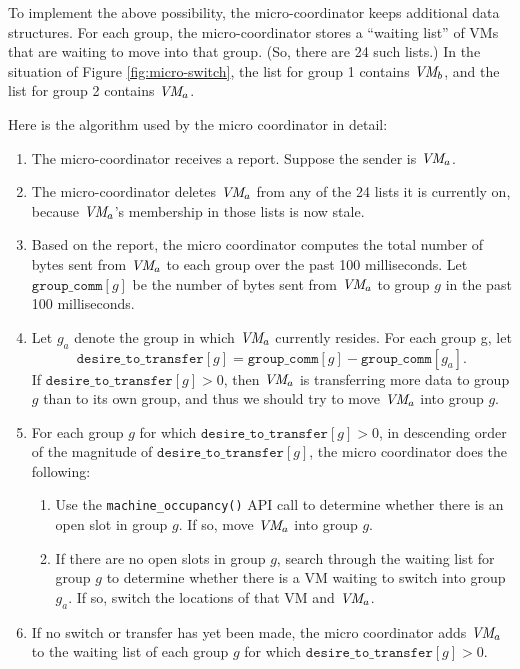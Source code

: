 \documentclass[11pt]{article}
\begin{document}
To implement the above possibility, the micro-coordinator keeps additional data structures.  For each group, the micro-coordinator stores a ``waiting list'' of VMs that are waiting to move into that group.  (So, there are 24 such lists.)  In the situation of Figure \ref{fig:micro-switch}, the list for group 1 contains $\textit{VM}_b$, and the list for group 2 contains $\textit{VM}_a$.

Here is the algorithm used by the micro coordinator in detail:
\begin{enumerate}
  \item The micro-coordinator receives a report.  Suppose the sender is $\textit{VM}_a$.
  \item The micro-coordinator deletes $\textit{VM}_a$ from any of the 24 lists it is currently on, because $\textit{VM}_a$'s membership in those lists is now stale.
  \item Based on the report, the micro coordinator computes the total number of bytes sent from $\textit{VM}_a$ to each group over the past 100 milliseconds.  Let $\texttt{group\_comm}[g]$ be the number of bytes sent from $\textit{VM}_a$ to group $g$ in the past 100 milliseconds.
  \item Let $g_a$ denote the group in which $\textit{VM}_a$ currently resides.  For each group g, let
    \[ \texttt{desire\_to\_transfer}[g] = \texttt{group\_comm}[g] - \texttt{group\_comm}[g_a]. \]
    If $\texttt{desire\_to\_transfer}[g] > 0$, then $\textit{VM}_a$ is transferring more data to group $g$ than to its own group, and thus we should try to move $\textit{VM}_a$ into group $g$.
  \item For each group $g$ for which $\texttt{desire\_to\_transfer}[g] > 0$, in descending order of the magnitude of $\texttt{desire\_to\_transfer}[g]$, the micro coordinator does the following:
    \begin{enumerate}[label=(\alph{*})]
      \item Use the \texttt{machine\_occupancy()} API call to determine whether there is an open slot in group $g$.  If so, move $\textit{VM}_a$ into group $g$.
      \item If there are no open slots in group $g$, search through the waiting list for group $g$ to determine whether there is a VM waiting to switch into group $g_a$.  If so, switch the locations of that VM and $\textit{VM}_a$.
    \end{enumerate}

  \item If no switch or transfer has yet been made, the micro coordinator adds $\textit{VM}_a$ to the waiting list of each group $g$ for which $\texttt{desire\_to\_transfer}[g] > 0$.
\end{enumerate}
\end{document}
